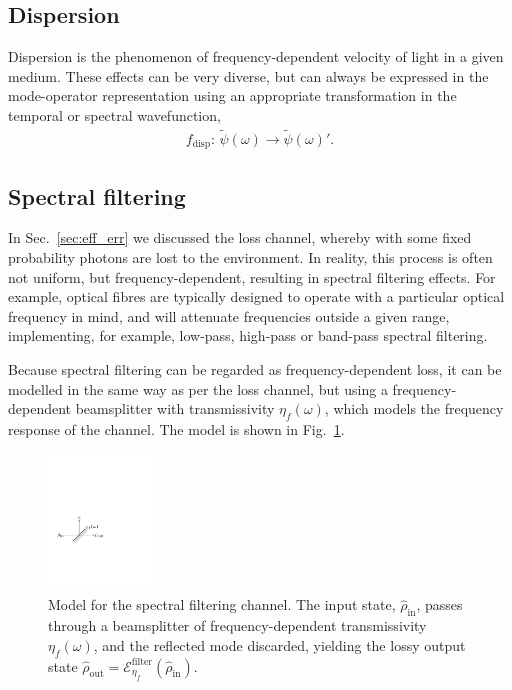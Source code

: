 %
%

\subsection{Dispersion} \label{sec:dispersion}

Dispersion is the phenomenon of frequency-dependent velocity of light in a given medium. These effects can be very diverse, but can always be expressed in the mode-operator representation using an appropriate transformation in the temporal or spectral wavefunction,
\begin{align}
f_\text{disp}: \,\tilde\psi(\omega)\to\tilde\psi(\omega)'.
\end{align}

%
%

\subsection{Spectral filtering} \label{sec:spectral_filt} 

In Sec.~\ref{sec:eff_err} we discussed the loss channel, whereby with some fixed probability photons are lost to the environment. In reality, this process is often not uniform, but frequency-dependent, resulting in spectral filtering effects. For example, optical fibres are typically designed to operate with a particular optical frequency in mind, and will attenuate frequencies outside a given range, implementing, for example, low-pass, high-pass or band-pass spectral filtering.

Because spectral filtering can be regarded as frequency-dependent loss, it can be modelled in the same way as per the loss channel, but using a frequency-dependent beamsplitter with transmissivity $\eta_f(\omega)$, which models the frequency response of the channel. The model is shown in Fig.~\ref{fig:spectral_filter_model}.

\begin{figure}[!htb]
	\includegraphics[width=0.25\textwidth]{spectral_filter_model}
	\caption{Model for the spectral filtering channel. The input state, $\hat\rho_\text{in}$, passes through a beamsplitter of frequency-dependent transmissivity $\eta_f(\omega)$, and the reflected mode discarded, yielding the lossy output state \mbox{$\hat\rho_\text{out} = \mathcal{E}^\text{filter}_{\eta_f}(\hat\rho_\text{in})$}.} \label{fig:spectral_filter_model} 
\end{figure}

